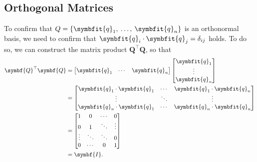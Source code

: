 \documentclass{article}
\begin{document}
\subsection{Orthogonal Matrices}
To confirm that \(Q = \left\{ \symbfit{q}_1,\: \dots,\: \symbfit{q}_n \right\}\) is an orthonormal basis, we need to confirm that \(\symbfit{q}_i \cdot \symbfit{q}_j = \delta_{ij}\) holds.
To do so, we can construct the matrix product \(\symbf{Q}^\top \symbf{Q}\), so that
\begin{align*}
    \symbf{Q}^\top \symbf{Q} & = \begin{bmatrix}
                                     \symbfit{q}_1 & \cdots & \symbfit{q}_n
                                 \end{bmatrix} \begin{bmatrix}
                                                   \symbfit{q}_1 \\
                                                   \vdots        \\
                                                   \symbfit{q}_n
                                               \end{bmatrix}                                         \\
                             & = \begin{bmatrix}
                                     \symbfit{q}_1 \cdot \symbfit{q}_1 & \cdots & \symbfit{q}_1 \cdot \symbfit{q}_n \\
                                     \vdots                            & \ddots & \vdots                            \\
                                     \symbfit{q}_n \cdot \symbfit{q}_1 & \cdots & \symbfit{q}_n \cdot \symbfit{q}_n
                                 \end{bmatrix} \\
                             & = \begin{bmatrix}
                                     1      & 0      & \cdots & 0      \\
                                     0      & 1      & \ddots & \vdots \\
                                     \vdots & \ddots & \ddots & 0      \\
                                     0      & \cdots & 0      & 1
                                 \end{bmatrix}                                              \\
                             & = \symbf{I}.
\end{align*}
\end{document}
